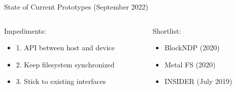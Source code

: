 \documentclass[aspectratio=169]{beamer}
\begin{document}
\begin{frame}{State of Current Prototypes (September 2022)}
    \begin{columns}
        \begin{column}{0.5\textwidth}
            Impediments:
            \footnotesize
            \begin{itemize}
                \item 1. API between host and device
                \item 2. Keep filesystem synchronized
                \item 3. Stick to existing interfaces
            \end{itemize}
        \end{column}
        \begin{column}{0.5\textwidth}
            Shortlist:
            \footnotesize
            \begin{itemize}
                \item BlockNDP (2020) \footnotemark[2]
                \item Metal FS (2020) \footnotemark[3]
                \item INSIDER (July 2019) \footnotemark[4]
            \end{itemize}
        \end{column}
    \end{columns}
\end{frame}
\end{document}
